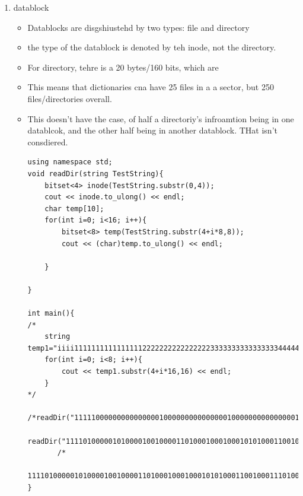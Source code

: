 \documentclass{article}
\begin{document}
\begin{enumerate}
\begin{enumerate}


\item datablock
\label{sec:org91ec5ff}
\begin{itemize}
\item Datablocks are disgshiustehd by two types: file and directory
\item the type of the datablock is denoted by teh inode, not the directory.
\item For directory, tehre is a 20 bytes/160 bits, which are
\item This means that dictionaries cna have 25 files in a a sector, but 250 files/directories overall.
\item This doesn't have the case, of half a directoriy's infroamtion being in one datablcok, and the other half being in another datablock. THat isn't consdiered.
\begin{verbatim}
using namespace std;
void readDir(string TestString){
    bitset<4> inode(TestString.substr(0,4));
    cout << inode.to_ulong() << endl;
    char temp[10];
    for(int i=0; i<16; i++){
	    bitset<8> temp(TestString.substr(4+i*8,8));
	    cout << (char)temp.to_ulong() << endl;

    }

}

int main(){
/*
	string temp1="iiii11111111111111112222222222222222333333333333333344444444444444445555555555555555666666666666666677777777777777778888888888888888";
	for(int i=0; i<8; i++){
	    cout << temp1.substr(4+i*16,16) << endl;
	}
*/
	/*readDir("111110000000000000001000000000000000100000000000000010000000000000001000000000000000100000000000000010000000000000001000000000000000");*/
       readDir("111101000001010000100100001101000100010001010100011001000111010010000100000101000010010000110100010001000101010001100100011101001000");
       /*
       111101000001010000100100001101000100010001010100011001000111010010000100000101000010010000110100010001000101010001100100011101001000*/
}


\end{verbatim}
\end{itemize}
\end{enumerate}
\end{enumerate}
\end{document}
